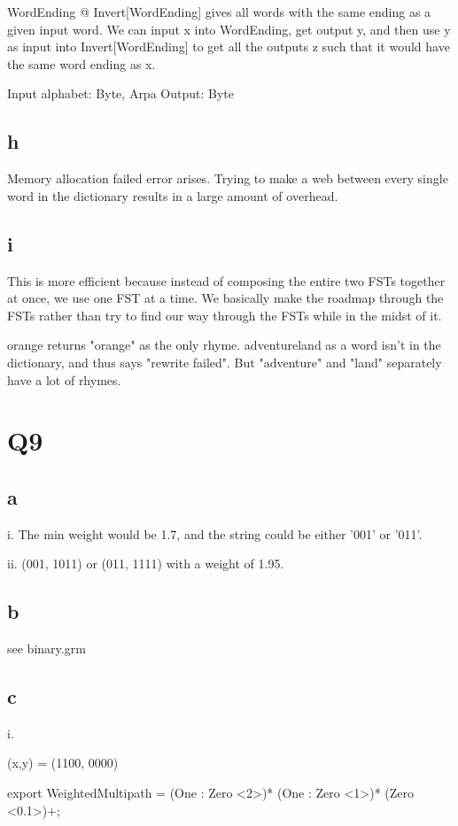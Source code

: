 \documentclass[12pt, letterpaper]{article}
\begin{document}
WordEnding @ Invert[WordEnding] gives all words with the same ending as a given input word. We can input x into WordEnding, get output y, and then use y as input into Invert[WordEnding] to get all the outputs z such that it would have the same word ending as x. 

Input alphabet: Byte, Arpa
Output: Byte

\subsection{h}
Memory allocation failed error arises. 
Trying to make a web between every single word in the dictionary results in a large amount of overhead. 

\subsection{i}

This is more efficient because instead of composing the entire two FSTs together at once, we use one FST at a time. We basically make the roadmap through the FSTs rather than try to find our way through the FSTs while in the midst of it. 

orange returns "orange" as the only rhyme.
adventureland as a word isn't in the dictionary, and thus says "rewrite failed".
But "adventure" and "land" separately have a lot of rhymes. 

\section{Q9}
\subsection{a}
i. The min weight would be 1.7, and the string could be either '001' or '011'. 

ii. (001, 1011) or (011, 1111) with a weight of 1.95.

\subsection{b}
see binary.grm

\subsection{c}
i. 

(x,y) = (1100, 0000)

export WeightedMultipath = (One : Zero <2>)* (One : Zero <1>)* (Zero <0.1>)+;
\end{document}
